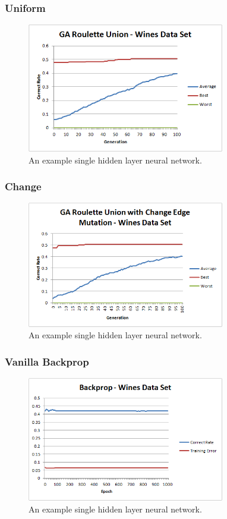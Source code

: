 \documentclass[journal]{IEEEtran}
\begin{document}
		\subsubsection{Uniform}
			\begin{figure}[here]%
			  \centering
			  \includegraphics[width=3.4in]{wine_uniform}
			  \caption{An example single hidden layer neural network.}
			  \label{fig:wine_uniform}
			\end{figure}
			
		\subsubsection{Change}
			\begin{figure}[here]%
			  \centering
			  \includegraphics[width=3.4in]{wine_change_edge}
			  \caption{An example single hidden layer neural network.}
			  \label{fig:wine_change_edge}
			\end{figure}
		\subsubsection{Vanilla Backprop}
			\begin{figure}[here]%
			  \centering
			  \includegraphics[width=3.4in]{brain_wine}
			  \caption{An example single hidden layer neural network.}
			  \label{fig:brain_wine}
			\end{figure}
		
\end{document}
